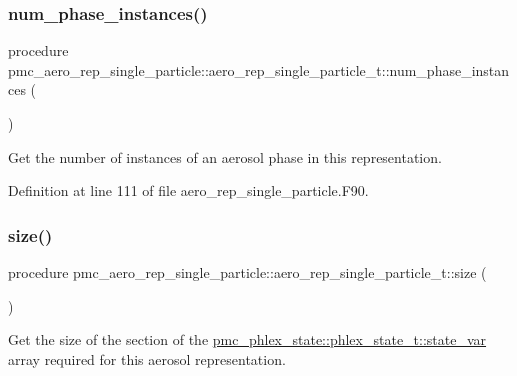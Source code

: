 \subsubsection{\texorpdfstring{num\+\_\+phase\+\_\+instances()}{num\_phase\_instances()}}
{\footnotesize\ttfamily procedure pmc\+\_\+aero\+\_\+rep\+\_\+single\+\_\+particle\+::aero\+\_\+rep\+\_\+single\+\_\+particle\+\_\+t\+::num\+\_\+phase\+\_\+instances (\begin{DoxyParamCaption}{ }\end{DoxyParamCaption})\hspace{0.3cm}{\ttfamily [private]}}



Get the number of instances of an aerosol phase in this representation. 



Definition at line 111 of file aero\+\_\+rep\+\_\+single\+\_\+particle.\+F90.

\mbox{\label{structpmc__aero__rep__single__particle_1_1aero__rep__single__particle__t_ac83035311d1527591944931a5c6b75ff}} 
\subsubsection{\texorpdfstring{size()}{size()}}
{\footnotesize\ttfamily procedure pmc\+\_\+aero\+\_\+rep\+\_\+single\+\_\+particle\+::aero\+\_\+rep\+\_\+single\+\_\+particle\+\_\+t\+::size (\begin{DoxyParamCaption}{ }\end{DoxyParamCaption})\hspace{0.3cm}{\ttfamily [private]}}



Get the size of the section of the {\ttfamily \mbox{\hyperlink{structpmc__phlex__state_1_1phlex__state__t_a78835cb552d483ebbfc7a6bc6f756918}{pmc\+\_\+phlex\+\_\+state\+::phlex\+\_\+state\+\_\+t\+::state\+\_\+var}}} array required for this aerosol representation. 

